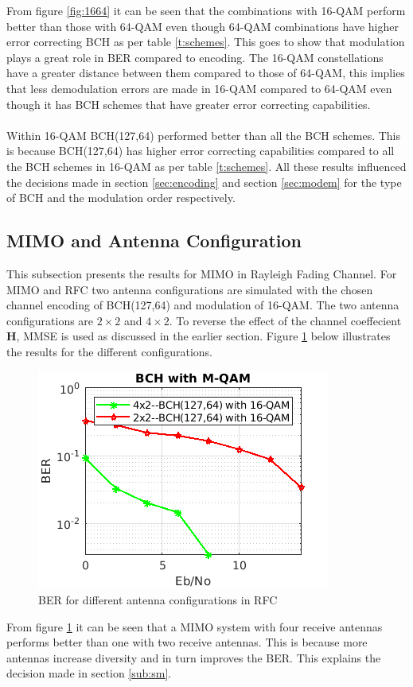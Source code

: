 \documentclass[11pt]{report}
\renewcommand{\vec}[1]{\mathbf{#1}} %
\begin{document}
\vspace{12pt}
From figure \ref{fig:1664} it can be seen that the combinations with 16-QAM perform better than those with 64-QAM even though 64-QAM combinations have higher error correcting BCH as per table \ref{t:schemes}. This goes to show that modulation plays a great role in BER compared to encoding. The 16-QAM constellations have a greater distance between them compared to those of 64-QAM, this implies that less demodulation errors are made in 16-QAM compared to 64-QAM even though it has BCH schemes that have greater error correcting capabilities.
\\
\\
Within 16-QAM BCH(127,64) performed better than all the BCH schemes. This is because BCH(127,64) has higher error correcting capabilities compared to all the BCH schemes in 16-QAM as per table \ref{t:schemes}. All these results influenced the decisions made in section \ref{sec:encoding} and section \ref{sec:modem} for the type of BCH and the modulation order respectively.

\subsection{MIMO and Antenna Configuration}
This subsection presents the results for MIMO in Rayleigh Fading Channel. For MIMO and RFC two antenna configurations are simulated with the chosen channel encoding of BCH(127,64) and modulation of 16-QAM. The two antenna configurations are $2\times2$ and $4\times2$. To reverse the effect of the channel coeffecient $\vec{H}$, MMSE is used as discussed in the earlier section. Figure \ref{fig:anten} below illustrates the results for the different configurations.

\begin{figure}[h!]
	\centering
	\includegraphics[scale=1]{resources/twotwoV2.png}
	\caption{BER for different antenna configurations in RFC}
	\label{fig:anten}
\end{figure}
From  figure \ref{fig:anten} it can be seen that a MIMO system with four receive antennas performs better than one with two receive antennas. This is because more antennas increase diversity and in turn improves the BER. This explains the decision made in section \ref{sub:sm}.
\end{document}
